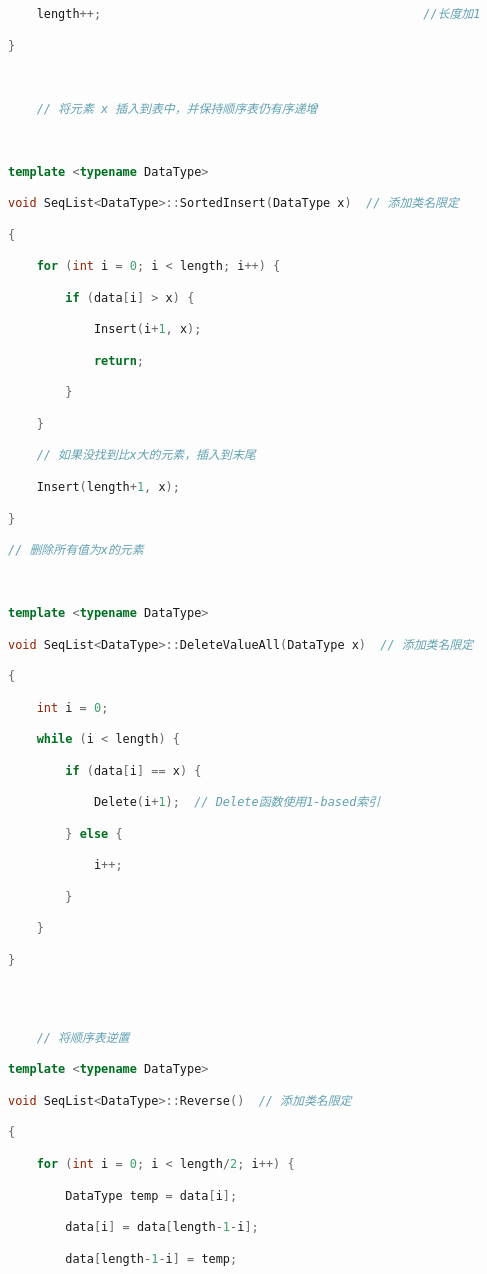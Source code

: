 \begin{lstlisting}[language=C++]
    length++;                                             //长度加1

}

  

    // 将元素 x 插入到表中，并保持顺序表仍有序递增

  

template <typename DataType>  

void SeqList<DataType>::SortedInsert(DataType x)  // 添加类名限定

{

    for (int i = 0; i < length; i++) {

        if (data[i] > x) {

            Insert(i+1, x);

            return;

        }

    }

    // 如果没找到比x大的元素，插入到末尾

    Insert(length+1, x);

}

// 删除所有值为x的元素

  

template <typename DataType>  

void SeqList<DataType>::DeleteValueAll(DataType x)  // 添加类名限定

{

    int i = 0;

    while (i < length) {

        if (data[i] == x) {

            Delete(i+1);  // Delete函数使用1-based索引

        } else {

            i++;

        }

    }

}

  
  

    // 将顺序表逆置

template <typename DataType>  

void SeqList<DataType>::Reverse()  // 添加类名限定

{

    for (int i = 0; i < length/2; i++) {

        DataType temp = data[i];

        data[i] = data[length-1-i];

        data[length-1-i] = temp;


\end{lstlisting}
